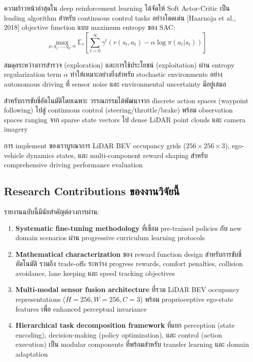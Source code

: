 \documentclass[10pt,a4paper,twocolumn]{article}
\begin{document}
ความก้าวหน้าล่าสุดใน deep reinforcement learning ได้จัดให้ Soft Actor-Critic เป็น leading algorithm สำหรับ continuous control tasks อย่างโดดเด่น [Haarnoja et al., 2018] objective function แบบ maximum entropy ของ SAC:
\begin{equation}
    \max_{\mu, q_1,\dots,q_k, \alpha} \mathbb{E}_{\tau} \left[ \sum_{t=0}^{\infty} \gamma^t \left( r(s_t, a_t) - \alpha \log \pi(a_t|s_t) \right) \right]
\end{equation}

สมดุลระหว่างการสำรวจ (exploration) และการใช้ประโยชน์ (exploitation) ผ่าน entropy regularization term $\alpha$ ทำให้เหมาะอย่างยิ่งสำหรับ stochastic environments อย่าง autonomous driving ที่ sensor noise และ environmental uncertainty มีอยู่เสมอ

สำหรับการขับขี่อัตโนมัติโดยเฉพาะ วรรณกรรมได้พัฒนาจาก discrete action spaces (waypoint following) ไปสู่ continuous control (steering/throttle/brake) พร้อม observation spaces ranging จาก sparse state vectors ไป dense LiDAR point clouds และ camera imagery

การ implement ของเราบูรณาการ LiDAR BEV occupancy grids ($256 \times 256 \times 3$), ego-vehicle dynamics states, และ multi-component reward shaping สำหรับ comprehensive driving performance evaluation

\subsection{Research Contributions ของงานวิจัยนี้}

รายงานฉบับนี้มีนัยสำคัญต่อวงการผ่าน:
\begin{enumerate}
    \item \textbf{Systematic fine-tuning methodology} ที่เชื่อม pre-trained policies กับ new domain scenarios ผ่าน progressive curriculum learning protocols
    
    \item \textbf{Mathematical characterization} ของ reward function design สำหรับการขับขี่อัตโนมัติ รวมถึง trade-offs ระหว่าง progress rewards, comfort penalties, collision avoidance, lane keeping และ speed tracking objectives
    
    \item \textbf{Multi-modal sensor fusion architecture} ที่รวม LiDAR BEV occupancy representations ($H=256, W=256, C=3$) พร้อม proprioceptive ego-state features เพื่อ enhanced perceptual invariance
    
    \item \textbf{Hierarchical task decomposition framework} ที่แยก perception (state encoding), decision-making (policy optimization), และ control (action execution) เป็น modular components ที่พร้อมสำหรับ transfer learning และ domain adaptation
\end{enumerate}
\end{document}

